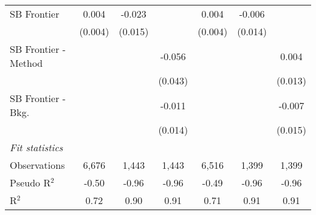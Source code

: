 \begin{tabular}{lcccccc}
   SB Frontier          & 0.004        & -0.023  &              & 0.004        & -0.006  &   \\   
                        & (0.004)      & (0.015) &              & (0.004)      & (0.014) &   \\   
   SB Frontier - Method &              &         & -0.056       &              &         & 0.004\\   
                        &              &         & (0.043)      &              &         & (0.013)\\   
   SB Frontier - Bkg.   &              &         & -0.011       &              &         & -0.007\\   
                        &              &         & (0.014)      &              &         & (0.015)\\   
   \midrule
   \emph{Fit statistics}\\
   Observations         & 6,676        & 1,443   & 1,443        & 6,516        & 1,399   & 1,399\\  
   Pseudo R$^2$         & -0.50        & -0.96   & -0.96        & -0.49        & -0.96   & -0.96\\  
   R$^2$                & 0.72         & 0.90    & 0.91         & 0.71         & 0.91    & 0.91\\  
   

\end{tabular}
